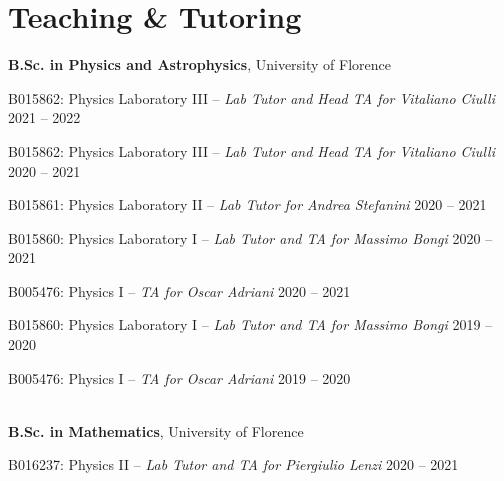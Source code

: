 \newcommand{\teaching}[2]
  {\normalsize \textbf{\color{hlcolor-0} #1}, {\color{hlcolor-1} #2}}
  
\newcommand{\teachclass}[3]
  {{\normalsize \color{maincolor} #1 --}
  {\small \color{maincolor} \emph{#2}} \hfill 
  {\normalsize \color{hlcolor-2} #3}}


\section*{Teaching \& Tutoring}
\begin{cvcontent}
  \teaching{B.Sc. in Physics and Astrophysics}{University of Florence}
  \\ [0.5mm]
  \begin{itemize*}[label=\textcolor{iconcolor}{\textbullet}]
    \item \teachclass{B015862: Physics Laboratory III}{Lab Tutor and Head TA for Vitaliano Ciulli}{2021 -- 2022}\\ [0.5mm]
    \item \teachclass{B015862: Physics Laboratory III}{Lab Tutor and Head TA for Vitaliano Ciulli}{2020 -- 2021}\\ [0.5mm]
    \item \teachclass{B015861: Physics Laboratory II}{Lab Tutor for Andrea Stefanini}{2020 -- 2021}\\ [0.5mm]
    \item \teachclass{B015860: Physics Laboratory I}{Lab Tutor and TA for Massimo Bongi}{2020 -- 2021}\\ [0.5mm]
    \item \teachclass{B005476: Physics I}{TA for Oscar Adriani}{2020 -- 2021}\\ [0.5mm]
    \item \teachclass{B015860: Physics Laboratory I}{Lab Tutor and TA for Massimo Bongi}{2019 -- 2020}\\ [0.5mm]
    \item \teachclass{B005476: Physics I}{TA for Oscar Adriani}{2019 -- 2020}
  \end{itemize*}
  \\ [3mm]
  \teaching{B.Sc. in Mathematics}{University of Florence}
  \\ [0.5mm]
  \begin{itemize*}[label=\textcolor{iconcolor}{\textbullet}]
    \item \teachclass{B016237: Physics II}{Lab Tutor and TA for Piergiulio Lenzi}{2020 -- 2021}

\end{itemize*}
\end{cvcontent}
